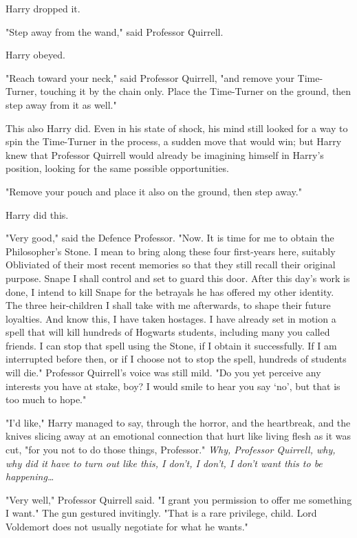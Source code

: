 Harry dropped it.

"Step away from the wand," said Professor Quirrell.

Harry obeyed.

"Reach toward your neck," said Professor Quirrell, "and remove your
Time-Turner, touching it by the chain only. Place the Time-Turner on the
ground, then step away from it as well."

This also Harry did. Even in his state of shock, his mind still looked for a
way to spin the Time-Turner in the process, a sudden move that would win; but
Harry knew that Professor Quirrell would already be imagining himself in
Harry's position, looking for the same possible opportunities.

"Remove your pouch and place it also on the ground, then step away."

Harry did this.

"Very good," said the Defence Professor. "Now. It is time for me to obtain the
Philosopher's Stone. I mean to bring along these four first-years here,
suitably Obliviated of their most recent memories so that they still recall
their original purpose. Snape I shall control and set to guard this door. After
this day's work is done, I intend to kill Snape for the betrayals he has
offered my other identity. The three heir-children I shall take with me
afterwards, to shape their future loyalties. And know this, I have taken
hostages. I have already set in motion a spell that will kill hundreds of
Hogwarts students, including many you called friends. I can stop that spell
using the Stone, if I obtain it successfully. If I am interrupted before then,
or if I choose not to stop the spell, hundreds of students will die." Professor
Quirrell's voice was still mild. "Do you yet perceive any interests you have at
stake, boy? I would smile to hear you say `no', but that is too much to hope."

"I'd like," Harry managed to say, through the horror, and the heartbreak, and
the knives slicing away at an emotional connection that hurt like living flesh
as it was cut, "for you not to do those things, Professor." \emph{Why,
Professor Quirrell, why, why did it have to turn out like this, I don't, I
don't, I don't want this to be happening{\ldots}}

"Very well," Professor Quirrell said. "I grant you permission to offer me
something I want." The gun gestured invitingly. "That is a rare privilege,
child. Lord Voldemort does not usually negotiate for what he wants."

